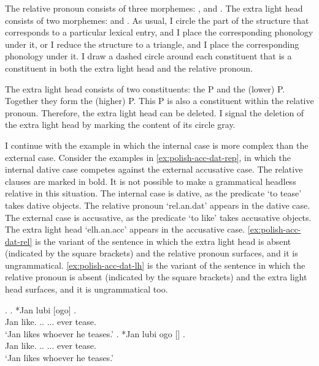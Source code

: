 The relative pronoun consists of three morphemes: ,  and .
The extra light head consists of two morphemes:  and .
As usual, I circle the part of the structure that corresponds to a particular lexical entry, and I place the corresponding phonology under it, or I reduce the structure to a triangle, and I place the corresponding phonology under it.
I draw a dashed circle around each constituent that is a constituent in both the extra light head and the relative pronoun.

The extra light head consists of two constituents: the P and the (lower) P. Together they form the (higher) P.
This P is also a constituent within the relative pronoun. Therefore, the extra light head can be deleted. I signal the deletion of the extra light head by marking the content of its circle gray.

I continue with the example in which the internal case is more complex than the external case.
Consider the examples in \ref{ex:polish-acc-dat-rep}, in which the internal dative case competes against the external accusative case. The relative clauses are marked in bold. It is not possible to make a grammatical headless relative in this situation.
The internal case is dative, as the predicate  `to tease' takes dative objects. The relative pronoun  `\ac{rel}.\ac{an}.\ac{dat}' appears in the dative case.
The external case is accusative, as the predicate  `to like' takes accusative objects. The extra light head  `\ac{elh}.\ac{an}.\ac{acc}' appears in the accusative case.
\ref{ex:polish-acc-dat-rel} is the variant of the sentence in which the extra light head is absent (indicated by the square brackets) and the relative pronoun surfaces, and it is ungrammatical.
\ref{ex:polish-acc-dat-lh} is the variant of the sentence in which the relative pronoun is absent (indicated by the square brackets) and the extra light head surfaces, and it is ungrammatical too.

\ex.\label{ex:polish-acc-dat-rep}
\ag. *Jan lubi [ogo]   .\\
Jan like.\scsub{[acc]} .. ... ever tease.\scsub{[dat]}\\
`Jan likes whoever he teases.' \label{ex:polish-acc-dat-rel}
\bg. *Jan lubi ogo []  .\\
Jan like.\scsub{[acc]} .. ... ever tease.\scsub{[dat]}\\
`Jan likes whoever he teases.' \label{ex:polish-acc-dat-lh}

